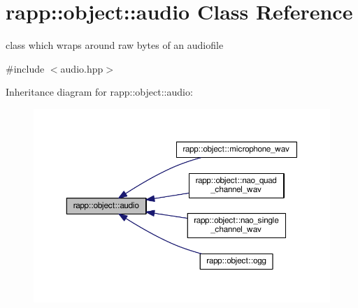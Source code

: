 \hypertarget{classrapp_1_1object_1_1audio}{\section{rapp\-:\-:object\-:\-:audio Class Reference}
\label{classrapp_1_1object_1_1audio}
}


class which wraps around raw bytes of an audiofile  




{\ttfamily \#include $<$audio.\-hpp$>$}



Inheritance diagram for rapp\-:\-:object\-:\-:audio\-:
\nopagebreak
\begin{figure}[H]
\begin{center}
\leavevmode
\includegraphics[width=350pt]{classrapp_1_1object_1_1audio__inherit__graph}
\end{center}
\end{figure}
